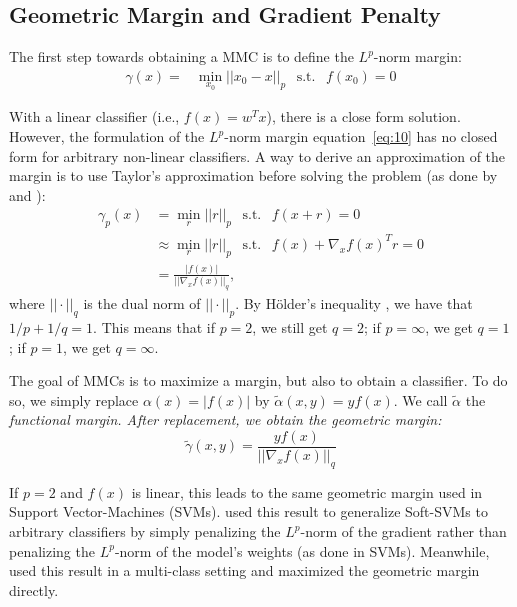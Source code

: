 \documentclass{article}
\def\eqref#1{equation~\ref{#1}}
\begin{document}
\subsection{Geometric Margin and Gradient Penalty}

The first step towards obtaining a  MMC is to define the $L^p$-norm margin:
\begin{align}\label{eq:10}
\gamma(x) = &\min_{x_0} || x_0 - x ||_p \hspace{5pt} \text{ s.t. } \hspace{5pt} f(x_0)=0
\end{align}

With a linear classifier (i.e., $f(x) = w^T x$), there is a close form solution. However, the formulation of the $L^p$-norm margin \eqref{eq:10} has no closed form for arbitrary non-linear classifiers. A way to derive an approximation of the margin is to use Taylor's approximation before solving the problem (as done by \citet{matyasko2017margin} and \citet{elsayed2018large}):
\begin{align*}
\gamma_p(x) &= \min_{r} || r ||_p \hspace{5pt} \text{ s.t. } \hspace{5pt} f(x+r)=0 \\
&\approx \min_{r} || r ||_p \hspace{5pt} \text{ s.t. } \hspace{5pt} f(x)+\nabla_x f(x)^T r=0 \\
&=\frac{|f(x)|}{|| \nabla_x f(x) ||_q},
\end{align*}
where $||\cdot||_q$ is the dual norm \citep{boyd2004convex} of $||\cdot||_p$. By Hölder's inequality \citep{holder1889ueber, rogers1888extension}, we have that $1/p + 1/q=1$. This means that if $p=2$, we still get $q=2$; if $p=\infty$, we get $q=1$; if $p=1$, we get $q=\infty$.

The goal of MMCs is to maximize a margin, but also to obtain a classifier. To do so, we simply replace $\alpha(x)=|f(x)|$ by $\widetilde{\alpha}(x,y) = y f(x)$. We call $\widetilde{\alpha}$ the \em functional margin\em. After replacement, we obtain the \em geometric margin\em:
\[\widetilde{\gamma}(x,y) = \frac{y f(x)}{|| \nabla_x f(x) ||_q}\]

If $p=2$ and $f(x)$ is linear, this leads to the same geometric margin used in Support Vector-Machines (SVMs). \citet{matyasko2017margin} used this result to generalize Soft-SVMs to arbitrary classifiers by simply penalizing the $L^p$-norm of the gradient rather than penalizing the $L^p$-norm of the model's weights (as done in SVMs). Meanwhile, \citet{elsayed2018large} used this result in a multi-class setting and maximized the geometric margin directly.
\end{document}
